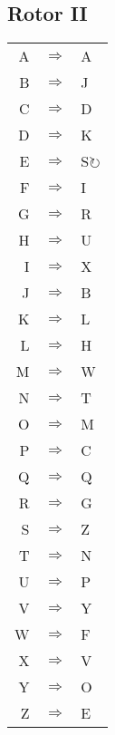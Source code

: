 \begin{multicols}{2}
\subsection{Rotor II}
\begin{supertabular}{rcl}
A & $\Rightarrow$ & A \\
B & $\Rightarrow$ & J \\
C & $\Rightarrow$ & D \\
D & $\Rightarrow$ & K \\
E & $\Rightarrow$ & S$\circlearrowright$ \\
F & $\Rightarrow$ & I \\
G & $\Rightarrow$ & R \\
H & $\Rightarrow$ & U \\
I & $\Rightarrow$ & X \\
J & $\Rightarrow$ & B \\
K & $\Rightarrow$ & L \\
L & $\Rightarrow$ & H \\
M & $\Rightarrow$ & W \\
N & $\Rightarrow$ & T \\
O & $\Rightarrow$ & M \\
P & $\Rightarrow$ & C \\
Q & $\Rightarrow$ & Q \\
R & $\Rightarrow$ & G \\
S & $\Rightarrow$ & Z \\
T & $\Rightarrow$ & N \\
U & $\Rightarrow$ & P \\
V & $\Rightarrow$ & Y \\
W & $\Rightarrow$ & F \\
X & $\Rightarrow$ & V \\
Y & $\Rightarrow$ & O \\
Z & $\Rightarrow$ & E \\
\end{supertabular}


\end{multicols}
